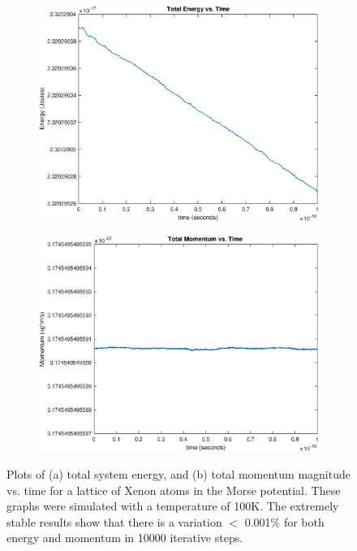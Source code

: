 \documentclass[12pt]{article}
\begin{document}
\begin{figure}[!h]
\begin{subfigure}{0.5\textwidth}
\includegraphics[width=0.9\linewidth]{./finalpics/MEvsT.eps}
\caption{\label{MEconservation}}
\end{subfigure}
\begin{subfigure}{0.5\textwidth}
\includegraphics[width=0.9\linewidth]{./finalpics/MPvsT.eps}
\caption{\label{MPconservation}}
\end{subfigure}
\caption{Plots of (a) total system energy, and (b) total momentum magnitude vs. time for a lattice of Xenon atoms in the Morse potential.  These graphs were simulated with a temperature of 100K.  The extremely stable results show that there is a variation $<$ 0.001\% for both energy and momentum in 10000 iterative steps.} 
\end{figure}
\end{document}
